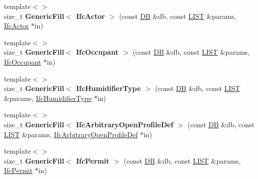 \begin{DoxyCompactItemize}
\item 
\hypertarget{namespace_assimp_1_1_s_t_e_p_a8b8c380c33ac9dbda43103f0e4666d05}{{\footnotesize template$<$$>$ }\\size\+\_\+t {\bfseries Generic\+Fill$<$ Ifc\+Actor $>$} (const \hyperlink{class_assimp_1_1_s_t_e_p_1_1_d_b}{D\+B} \&db, const \hyperlink{class_assimp_1_1_s_t_e_p_1_1_e_x_p_r_e_s_s_1_1_l_i_s_t}{L\+I\+S\+T} \&params, \hyperlink{struct_assimp_1_1_i_f_c_1_1_ifc_actor}{Ifc\+Actor} $\ast$in)}\label{namespace_assimp_1_1_s_t_e_p_a8b8c380c33ac9dbda43103f0e4666d05}

\item 
\hypertarget{namespace_assimp_1_1_s_t_e_p_a8a511bb83b7d506c2e5e06cad10f64fb}{{\footnotesize template$<$$>$ }\\size\+\_\+t {\bfseries Generic\+Fill$<$ Ifc\+Occupant $>$} (const \hyperlink{class_assimp_1_1_s_t_e_p_1_1_d_b}{D\+B} \&db, const \hyperlink{class_assimp_1_1_s_t_e_p_1_1_e_x_p_r_e_s_s_1_1_l_i_s_t}{L\+I\+S\+T} \&params, \hyperlink{struct_assimp_1_1_i_f_c_1_1_ifc_occupant}{Ifc\+Occupant} $\ast$in)}\label{namespace_assimp_1_1_s_t_e_p_a8a511bb83b7d506c2e5e06cad10f64fb}

\item 
\hypertarget{namespace_assimp_1_1_s_t_e_p_a5619d8daa0ceb7f610c54f7186a974fa}{{\footnotesize template$<$$>$ }\\size\+\_\+t {\bfseries Generic\+Fill$<$ Ifc\+Humidifier\+Type $>$} (const \hyperlink{class_assimp_1_1_s_t_e_p_1_1_d_b}{D\+B} \&db, const \hyperlink{class_assimp_1_1_s_t_e_p_1_1_e_x_p_r_e_s_s_1_1_l_i_s_t}{L\+I\+S\+T} \&params, \hyperlink{struct_assimp_1_1_i_f_c_1_1_ifc_humidifier_type}{Ifc\+Humidifier\+Type} $\ast$in)}\label{namespace_assimp_1_1_s_t_e_p_a5619d8daa0ceb7f610c54f7186a974fa}

\item 
\hypertarget{namespace_assimp_1_1_s_t_e_p_a2d9d343347baba652686fd19dac14c50}{{\footnotesize template$<$$>$ }\\size\+\_\+t {\bfseries Generic\+Fill$<$ Ifc\+Arbitrary\+Open\+Profile\+Def $>$} (const \hyperlink{class_assimp_1_1_s_t_e_p_1_1_d_b}{D\+B} \&db, const \hyperlink{class_assimp_1_1_s_t_e_p_1_1_e_x_p_r_e_s_s_1_1_l_i_s_t}{L\+I\+S\+T} \&params, \hyperlink{struct_assimp_1_1_i_f_c_1_1_ifc_arbitrary_open_profile_def}{Ifc\+Arbitrary\+Open\+Profile\+Def} $\ast$in)}\label{namespace_assimp_1_1_s_t_e_p_a2d9d343347baba652686fd19dac14c50}

\item 
\hypertarget{namespace_assimp_1_1_s_t_e_p_a6377746420080ef4256090f13a1ac694}{{\footnotesize template$<$$>$ }\\size\+\_\+t {\bfseries Generic\+Fill$<$ Ifc\+Permit $>$} (const \hyperlink{class_assimp_1_1_s_t_e_p_1_1_d_b}{D\+B} \&db, const \hyperlink{class_assimp_1_1_s_t_e_p_1_1_e_x_p_r_e_s_s_1_1_l_i_s_t}{L\+I\+S\+T} \&params, \hyperlink{struct_assimp_1_1_i_f_c_1_1_ifc_permit}{Ifc\+Permit} $\ast$in)}\label{namespace_assimp_1_1_s_t_e_p_a6377746420080ef4256090f13a1ac694}


\end{DoxyCompactItemize}
